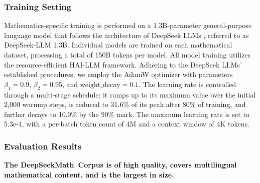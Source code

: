 \begin{itemize}[topsep=0pt]
\subsubsection{Training Setting}
\label{sec:quality-policy}
Mathematics-specific training is performed on a 1.3B-parameter general-purpose language model that follows the architecture of DeepSeek LLMs \citep{deepseek-llm}, referred to as DeepSeek-LLM 1.3B. Individual models are trained on each mathematical dataset, processing a total of 150B tokens per model. All model training utilizes the resource-efficient HAI-LLM \citep{haillm} framework. Adhering to the DeepSeek LLMs’ established procedures, we employ the AdamW optimizer \citep{adamW} with parameters $\beta_1=0.9$, $\beta_2=0.95$, and $\mathrm{weight\_decay}=0.1$. The learning rate is controlled through a multi-stage schedule: it ramps up to its maximum value over the initial 2,000 warmup steps, is reduced to 31.6\% of its peak after 80\% of training, and further decays to 10.0\% by the 90\% mark. The maximum learning rate is set to 5.3e-4, with a per-batch token count of 4M and a context window of 4K tokens.

\subsubsection{Evaluation Results}

\textbf{The DeepSeekMath~Corpus is of high quality, covers multilingual mathematical content, and is the largest in size.}


\end{itemize}
